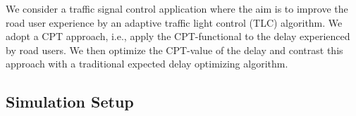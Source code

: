 We consider a traffic signal control application where the aim is to improve the road user experience by an adaptive traffic light control (TLC) algorithm.
We adopt a CPT approach, i.e., apply the CPT-functional to the delay experienced by road users. We then optimize the CPT-value of the delay  and contrast this approach with a traditional expected delay optimizing algorithm.

\subsection{Simulation Setup}  
%
